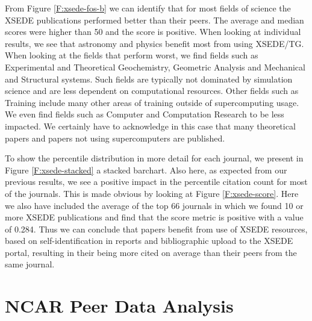 \documentclass{sig-alternate}
\begin{document}
From Figure \ref{F:xsede-fos-b} we can identify that for most fields of science the XSEDE publications performed better than their peers. The average and median scores were higher than 50 and the score is positive. When looking at individual results, we see that astronomy and physics benefit most from using XSEDE/TG. When looking at the fields that perform worst, we find fields such as Experimental and Theoretical Geochemistry, Geometric Analysis and Mechanical and Structural systems. Such fields are typically not dominated by simulation science and are less dependent on computational resources. Other fields such as Training include many other areas of training outside of supercomputing usage. We even find fields such as Computer and Computation Research to be less impacted. We certainly have to acknowledge in this case that many theoretical papers and papers not using supercomputers are published. 

To show the percentile distribution in more detail for each journal, we present in Figure \ref{F:xsede-stacked} a stacked barchart. Also here, as expected from our previous results, we see a positive impact in the percentile citation count for most of the journals. This is made obvious by looking at Figure \ref{F:xsede-score}. Here we also have included the average of the top 66 journals in which we found 10 or more XSEDE publications and find that the score metric is positive with a value of 0.284. Thus we can conclude that papers benefit from use of XSEDE resources, based on self-identification in reports and bibliographic upload to the XSEDE portal, resulting in their being more cited on average than their peers from the same journal.

\section{NCAR Peer Data Analysis}\label{S:ncar}
\end{document}
